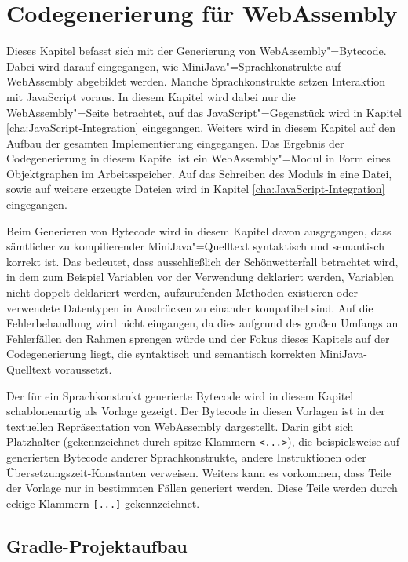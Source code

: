 \chapter{Codegenerierung für WebAssembly}
\label{cha:Codegenerierung-für-WebAssembly}

Dieses Kapitel befasst sich mit der Generierung von WebAssembly"=Bytecode. Dabei wird darauf eingegangen, wie MiniJava"=Sprachkonstrukte auf WebAssembly abgebildet werden. Manche Sprachkonstrukte setzen Interaktion mit JavaScript voraus. In diesem Kapitel wird dabei nur die WebAssembly"=Seite betrachtet, auf das JavaScript"=Gegenstück wird in Kapitel \ref{cha:JavaScript-Integration} eingegangen. Weiters wird in diesem Kapitel auf den Aufbau der gesamten Implementierung eingegangen. Das Ergebnis der Codegenerierung in diesem Kapitel ist ein WebAssembly"=Modul in Form eines Objektgraphen im Arbeitsspeicher. Auf das Schreiben des Moduls in eine Datei, sowie auf weitere erzeugte Dateien wird in Kapitel \ref{cha:JavaScript-Integration} eingegangen.

Beim Generieren von Bytecode wird in diesem Kapitel davon ausgegangen, dass sämtlicher zu kompilierender MiniJava"=Quelltext syntaktisch und semantisch korrekt ist. Das bedeutet, dass ausschließlich der Schönwetterfall betrachtet wird, in dem zum Beispiel Variablen vor der Verwendung deklariert werden, Variablen nicht doppelt deklariert werden, aufzurufenden Methoden existieren oder verwendete Datentypen in Ausdrücken zu einander kompatibel sind. Auf die Fehlerbehandlung wird nicht eingangen, da dies aufgrund des großen Umfangs an Fehlerfällen den Rahmen sprengen würde und der Fokus dieses Kapitels auf der Codegenerierung liegt, die syntaktisch und semantisch korrekten MiniJava-Quelltext voraussetzt.

Der für ein Sprachkonstrukt generierte Bytecode wird in diesem Kapitel schablonenartig als Vorlage gezeigt. Der Bytecode in diesen Vorlagen ist in der textuellen Repräsentation von WebAssembly dargestellt. Darin gibt sich Platzhalter (gekennzeichnet durch spitze Klammern \lstinline{<...>}), die beispielsweise auf generierten Bytecode anderer Sprachkonstrukte, andere Instruktionen oder Übersetzungszeit-Konstanten verweisen. Weiters kann es vorkommen, dass Teile der Vorlage nur in bestimmten Fällen generiert werden. Diese Teile werden durch eckige Klammern \lstinline{[...]} gekennzeichnet.

\pagebreak
\section{Gradle-Projektaufbau}


